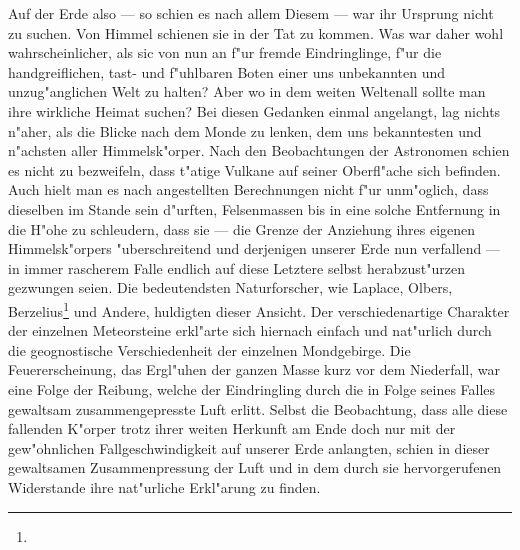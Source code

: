 \documentclass[a4paper, 8pt, oneside, polutonikogreek, german]{article}
\begin{document}
Auf der Erde also — so schien es nach allem Diesem — war ihr Ursprung nicht zu suchen. Von Himmel schienen sie in der Tat zu kommen. Was war daher wohl wahrscheinlicher, als sic von nun an f"ur fremde Eindringlinge, f"ur die handgreiflichen, tast- und f"uhlbaren Boten einer uns unbekannten und unzug"anglichen Welt zu halten? Aber wo in dem weiten Weltenall sollte man ihre wirkliche Heimat suchen? Bei diesen Gedanken einmal angelangt, lag nichts n"aher, als die Blicke nach dem Monde zu lenken, dem uns bekanntesten und n"achsten aller Himmelsk"orper. Nach den Beobachtungen der Astronomen schien es nicht zu bezweifeln, dass t"atige Vulkane auf seiner Oberfl"ache sich befinden. Auch hielt man es nach angestellten Berechnungen nicht f"ur unm"oglich, dass dieselben im Stande sein d"urften, Felsenmassen bis in eine solche Entfernung in die H"ohe zu schleudern, dass sie — die Grenze der Anziehung ihres eigenen Himmelsk"orpers "uberschreitend und derjenigen unserer Erde nun verfallend — in immer rascherem Falle endlich auf diese Letztere selbst herabzust"urzen gezwungen seien. Die bedeutendsten Naturforscher, wie Laplace, Olbers, Berzelius\footnote{} und Andere, huldigten dieser Ansicht. Der verschiedenartige Charakter der einzelnen Meteorsteine erkl"arte sich hiernach einfach und nat"urlich durch die geognostische Verschiedenheit der einzelnen Mondgebirge. Die Feuererscheinung, das Ergl"uhen der ganzen Masse kurz vor dem Niederfall, war eine Folge der Reibung, welche der Eindringling durch die in Folge seines Falles gewaltsam zusammengepresste Luft erlitt. Selbst die Beobachtung, dass alle diese fallenden K"orper trotz ihrer weiten Herkunft am Ende doch nur mit der gew"ohnlichen Fallgeschwindigkeit auf unserer Erde anlangten, schien in dieser gewaltsamen Zusammenpressung der Luft und in dem durch sie hervorgerufenen Widerstande ihre nat"urliche Erkl"arung zu finden.
\end{document}
